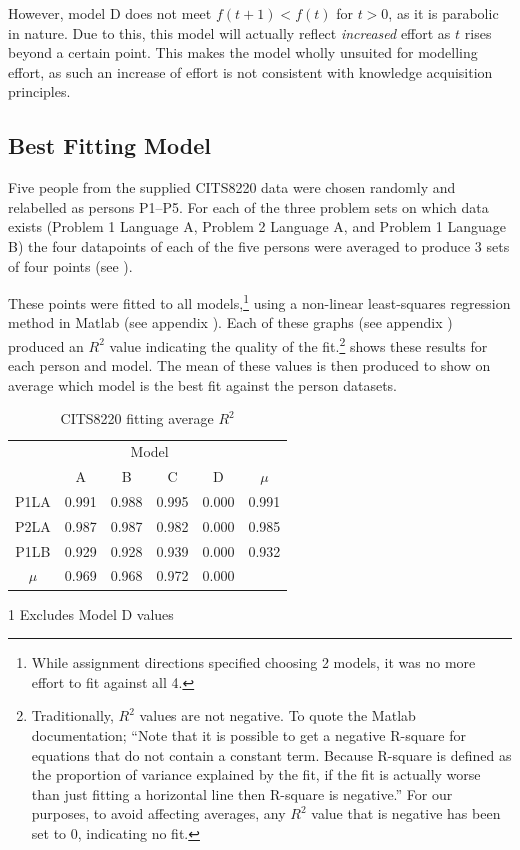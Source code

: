 \documentclass[a4paper,10pt]{article}
\begin{document}
However, model D does not meet $f(t+1) < f(t)$ for $t > 0$, as it is parabolic in nature. Due to this, this model will actually reflect \textit{increased} effort as $t$ rises beyond a certain point. This makes the model wholly unsuited for modelling effort, as such an increase of effort is not consistent with knowledge acquisition principles.

\subsection{Best Fitting Model}
Five people from the supplied CITS8220 data were chosen randomly and relabelled as persons P1--P5. For each of the three problem sets on which data exists (Problem 1 Language A, Problem 2 Language A, and Problem 1 Language B) the four datapoints of each of the five persons were averaged to produce 3 sets of four points (see ).

These points were fitted to all models,\footnote{While assignment directions specified choosing 2 models, it was no more effort to fit against all 4.} using a non-linear least-squares regression method in Matlab (see appendix ). Each of these graphs (see appendix ) produced an $R^2$ value indicating the quality of the fit.\footnote{Traditionally, $R^2$ values are not negative. To quote the Matlab documentation; ``Note that it is possible to get a negative R-square for equations that do not contain a constant term. Because R-square is defined as the proportion of variance explained by the fit, if the fit is actually worse than just fitting a horizontal line then R-square is negative.'' For our purposes, to avoid affecting averages, any $R^2$ value that is negative has been set to 0, indicating no fit.}  shows these results for each person and model. The mean of these values is then produced to show on average which model is the best fit against the person datasets.

\begin{table}[b]
  \centering
  \begin{threeparttable}
  \begin{tabular}{|c|cccc|c|}
  \cline{2-6}
  \multicolumn{1}{c|}{} & \multicolumn{4}{|c|}{Model} & \\ 
  \multicolumn{1}{c|}{} & A & B & C & D & $\mu$\tnote{1} \\ \hline
  P1LA & 0.991 & 0.988 & 0.995 & 0.000 & 0.991 \\
  P2LA & 0.987 & 0.987 & 0.982 & 0.000 & 0.985 \\
  P1LB & 0.929 & 0.928 & 0.939 & 0.000 & 0.932 \\ \hline
  $\mu$ & 0.969 & 0.968 & 0.972 & 0.000 & \multicolumn{1}{|c}{} \\
  \cline{1-5}
  \end{tabular}
  \begin{tablenotes}
   \item [1] Excludes Model D values
  \end{tablenotes}
  \caption{CITS8220 fitting average $R^2$}
  \label{tab:avgr2}
  \end{threeparttable}
\end{table}
\end{document}
